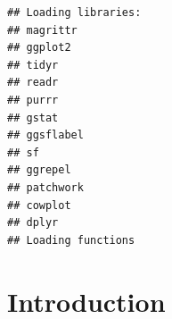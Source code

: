 \documentclass[draft,linenumbers]{agujournal2018}
\begin{document}



\begin{keypoints}
\item 
\item 
\item 
\end{keypoints}

%
%


\begin{abstract}

\end{abstract}
\begin{verbatim}
## Loading libraries:
## magrittr
## ggplot2
## tidyr
## readr
## purrr
## gstat
## ggsflabel
## sf
## ggrepel
## patchwork
## cowplot
## dplyr
## Loading functions
\end{verbatim}

\section{Introduction}
\end{document}

